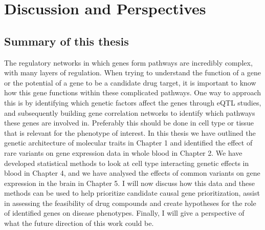 \chapter{Discussion and Perspectives}
\label{chap:discussion}

{ \Large {} }

\newpage

\section{Summary of this thesis}
The regulatory networks in which genes form pathways are incredibly complex, with many layers of regulation. When trying to understand the function of a gene or the potential of a gene to be a candidate drug target, it is important to know how this gene functions within these complicated pathways. One way to approach this is by identifying which genetic factors affect the genes through eQTL studies, and subsequently building gene correlation networks to identify which pathways these genes are involved in. Preferably this should be done in cell type or tissue that is relevant for the phenotype of interest. In this thesis we have outlined the genetic architecture of molecular traits in Chapter 1\cite{claringbouldGeneticArchitectureMolecular2017} and identified the effect of rare variants on gene expression data in whole blood in Chapter 2. We have developed statistical methods to look at cell type interacting genetic effects in blood in Chapter 4\cite{raulaguirre-gamboaDeconvolutionBulkBlood2020}, and we have analysed the effects of common variants on gene expression in the brain in Chapter 5. I will now discuss how this data and these methods can be used to help prioritize candidate causal gene prioritization, assist in assessing the feasibility of drug compounds and create hypotheses for the role of identified genes on disease phenotypes. Finally, I will give a perspective of what the future direction of this work could be. 

